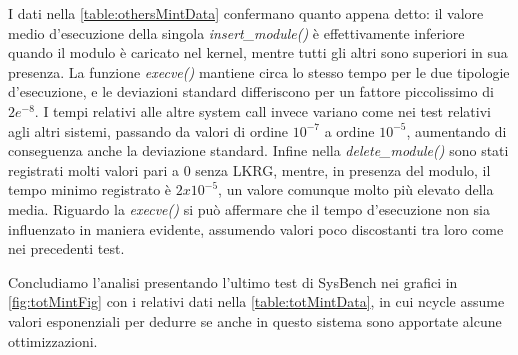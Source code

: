 I dati nella \autoref{table:othersMintData} confermano quanto appena detto: il valore medio d'esecuzione della singola \emph{insert\_module()} è effettivamente inferiore quando il modulo è caricato nel kernel, mentre tutti gli altri sono superiori in sua presenza. La funzione \emph{execve()} mantiene circa lo stesso tempo per le due tipologie d'esecuzione, e le deviazioni standard differiscono per un fattore piccolissimo di $2e^{-8}$. I tempi relativi alle altre system call invece variano come nei test relativi agli altri sistemi, passando da valori di ordine $10^{-7}$ a ordine $10^{-5}$, aumentando di conseguenza anche la deviazione standard. Infine nella \emph{delete\_module()} sono stati registrati molti valori pari a 0 senza LKRG, mentre, in presenza del modulo, il tempo minimo registrato è $2x10^{-5}$, un valore comunque molto più elevato della media.
Riguardo la \emph{execve()} si può affermare che il tempo d'esecuzione non sia influenzato in maniera evidente, assumendo valori poco discostanti tra loro come nei precedenti test.
\\\par

Concludiamo l'analisi presentando l'ultimo test di SysBench nei grafici in \autoref{fig:totMintFig} con i relativi dati nella \autoref{table:totMintData}, in cui ncycle assume valori esponenziali per dedurre se anche in questo sistema sono apportate alcune ottimizzazioni.

